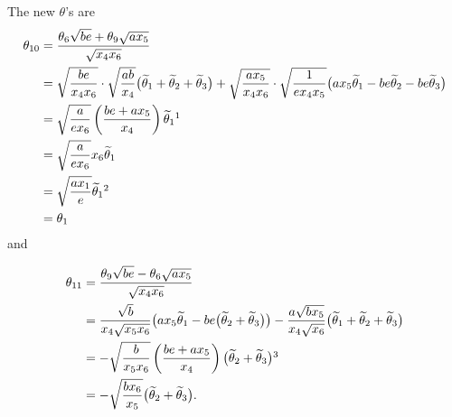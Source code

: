 \documentclass[11pt]{article}
\numberwithin{equation}{section}
\newcommand{\til}[0]{\widetilde{\theta}}
\numberwithin{equation}{section}
\begin{document}
{$\!\!$The new $\theta$'s are
\begin{align*}
\theta_{10}&=\frac{\theta_6\sqrt{be}+\theta_9\sqrt{ax_5}}{\sqrt{x_4x_6}}\\
&=\sqrt{be\over x_4x_6}\cdot\sqrt{ab\over x_4}\big(\til_1+\til_2+\til_3\big)+\sqrt{ax_5\over x_4x_6}\cdot\sqrt{1\over{ex_4x_5}}\big(ax_5\til_1-be\til_2-be\til_3\big)\\
&=\sqrt{a\over ex_6}\left(be+ax_5\over x_4\right)\til_1\footnotemark
\\
&=\sqrt{a\over ex_6}x_6\til_1\\
&=\sqrt{ax_1\over e}\til_1\footnotemark\\
&=\theta_1
\end{align*}
and
\addtocounter{footnote}{-1}
\addtocounter{footnote}{+1}
\begin{align*}
\theta_{11}&=\frac{\theta_9\sqrt{be}-\theta_6\sqrt{ax_5}}{\sqrt{x_4x_6}}\\
&={\sqrt{b}\over x_4\sqrt{x_5x_6}}\big( a x_5 \widetilde{\theta}_1 - be \big(\widetilde{\theta}_2 + \widetilde{\theta}_3\big) \big)-{a\sqrt{bx_5}\over x_4\sqrt{x_6}}\big(\til_1+\til_2+\til_3\big)\\
&=-\sqrt{b\over x_5x_6}\left(be+ax_5\over x_4\right)\big(\til_2+\til_3\big)\footnotemark\\
&=-\sqrt{b x_6\over x_5}\big(\til_2+\til_3\big).
\end{align*}

}
\end{document}
